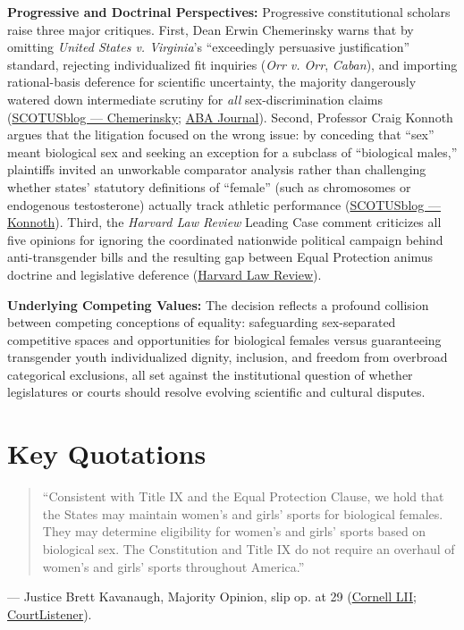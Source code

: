 \documentclass[12pt]{article}
\begin{document}
\textbf{Progressive and Doctrinal Perspectives:} Progressive constitutional scholars raise three major critiques. First, Dean Erwin Chemerinsky warns that by omitting \textit{United States v. Virginia}'s ``exceedingly persuasive justification'' standard, rejecting individualized fit inquiries (\textit{Orr v. Orr}, \textit{Caban}), and importing rational-basis deference for scientific uncertainty, the majority dangerously watered down intermediate scrutiny for \emph{all} sex-discrimination claims (\href{https://www.scotusblog.com/2026/08/weakening-the-protection-against-sex-discrimination/}{SCOTUSblog --- Chemerinsky}; \href{https://www.abajournal.com/columns/article/chemerinsky-how-supreme-courts-decisions-had-an-impact-on-democracy}{ABA Journal}). Second, Professor Craig Konnoth argues that the litigation focused on the wrong issue: by conceding that ``sex'' meant biological sex and seeking an exception for a subclass of ``biological males,'' plaintiffs invited an unworkable comparator analysis rather than challenging whether states' statutory definitions of ``female'' (such as chromosomes or endogenous testosterone) actually track athletic performance (\href{https://www.scotusblog.com/2026/07/why-the-supreme-court-decided-the-wrong-issue-in-the-transgender-athletes-cases/}{SCOTUSblog --- Konnoth}). Third, the \textit{Harvard Law Review} Leading Case comment criticizes all five opinions for ignoring the coordinated nationwide political campaign behind anti-transgender bills and the resulting gap between Equal Protection animus doctrine and legislative deference (\href{https://harvardlawreview.org/print/vol-140/west-virginia-v-b-p-j-ex-rel-jackson/}{Harvard Law Review}).

\textbf{Underlying Competing Values:} The decision reflects a profound collision between competing conceptions of equality: safeguarding sex-separated competitive spaces and opportunities for biological females versus guaranteeing transgender youth individualized dignity, inclusion, and freedom from overbroad categorical exclusions, all set against the institutional question of whether legislatures or courts should resolve evolving scientific and cultural disputes.

\section{Key Quotations}

\begin{quote}
``Consistent with Title IX and the Equal Protection Clause, we hold that the States may maintain women's and girls' sports for biological females. They may determine eligibility for women's and girls' sports based on biological sex. The Constitution and Title IX do not require an overhaul of women's and girls' sports throughout America.''
\end{quote}
--- Justice Brett Kavanaugh, Majority Opinion, slip op. at 29 (\href{https://www.law.cornell.edu/supremecourt/text/24-43}{Cornell LII}; \href{https://www.courtlistener.com/opinion/10882186/west-virginia-v-b-p-j/}{CourtListener}).
\end{document}
